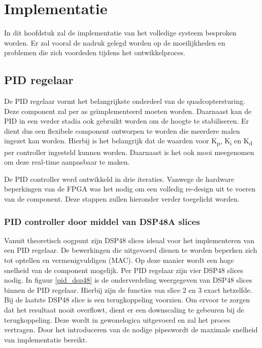 \chapter{Implementatie}

	\par In dit hoofdstuk zal de implementatie van het volledige systeem besproken worden. Er zal vooral de nadruk gelegd worden op de moeilijkheden en problemen die zich voordeden tijdens het ontwikkelproces.

	\section{PID regelaar}

		\par De PID regelaar vormt het belangrijkste onderdeel van de quadcoptersturing. Deze component zal per as ge\"implementeerd moeten worden. Daarnaast kan de PID in een verder stadia ook gebruikt worden om de hoogte te stabiliseren. Er dient dus een flexibele component ontworpen te worden die meerdere malen ingezet kan worden. Hierbij is het belangrijk dat de waarden voor K\textsubscript{p}, K\textsubscript{i} en K\textsubscript{d} per controller ingesteld kunnen worden. Daarnaast is het ook mooi meegenomen om deze real-time aanpasbaar te maken. 

		\par De PID controller werd ontwikkeld in drie iteraties. Vanwege de hardware beperkingen van de FPGA was het nodig om een volledig re-design uit te voeren van de component. Deze stappen zullen hieronder verder toegelicht worden.

		\subsection{PID controller door middel van DSP48A slices}

			\par Vanuit theoretisch oogpunt zijn DSP48 slices ideaal voor het implementeren van een PID regelaar. De bewerkingen die uitgevoerd dienen te worden beperken zich tot optellen en vermenigvuldigen (MAC). Op deze manier wordt een hoge snelheid van de component mogelijk. Per PID regelaar zijn vier DSP48 slices nodig. In figuur \ref{pid_dsp48} is de onderverdeling weergegeven van DSP48 slices binnen de PID regelaar. Hierbij zijn de functies van slice 2 en 3 exact hetzelfde. Bij de laatste DSP48 slice is een terugkoppeling voorzien. Om ervoor te zorgen dat het resultaat nooit overflowt, dient er een downscaling te gebeuren bij de terugkoppeling. Deze wordt in \textquotesingle gewone\textquotesingle   logica uitgevoerd en zal het proces vertragen. Door het introduceren van de nodige \textquotesingle pipes\textquotesingle  wordt de maximale snelheid van implementatie bereikt.
				
